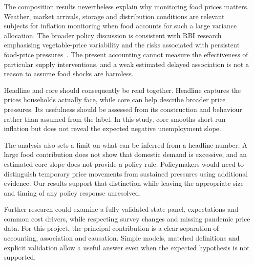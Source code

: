 \documentclass[11pt,a4paper]{article}
\begin{document}
The composition results nevertheless explain why monitoring food prices matters. Weather, market arrivals, storage and distribution conditions are relevant subjects for inflation monitoring when food accounts for such a large variance allocation. The broader policy discussion is consistent with RBI research emphasising vegetable-price variability and the risks associated with persistent food-price pressures~\cite{mohan2026,patra2024}. The present accounting cannot measure the effectiveness of particular supply interventions, and a weak estimated delayed association is not a reason to assume food shocks are harmless.

Headline and core should consequently be read together. Headline captures the prices households actually face, while core can help describe broader price pressures. Its usefulness should be assessed from its construction and behaviour rather than assumed from the label. In this study, core smooths short-run inflation but does not reveal the expected negative unemployment slope.

The analysis also sets a limit on what can be inferred from a headline number. A large food contribution does not show that domestic demand is excessive, and an estimated core slope does not provide a policy rule. Policymakers would need to distinguish temporary price movements from sustained pressures using additional evidence. Our results support that distinction while leaving the appropriate size and timing of any policy response unresolved.

Further research could examine a fully validated state panel, expectations and common cost drivers, while respecting survey changes and missing pandemic price data. For this project, the principal contribution is a clear separation of accounting, association and causation. Simple models, matched definitions and explicit validation allow a useful answer even when the expected hypothesis is not supported.
\label{main:last}
\end{document}
